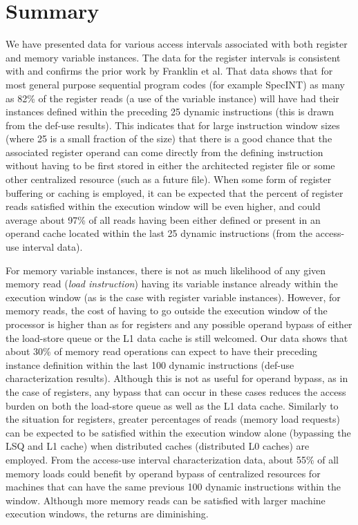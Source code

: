 \documentclass[10pt,dvips]{article}
\begin{document}
\section{Summary}
%
We have presented data for various access intervals associated
with both register and memory variable instances.
The data for the register intervals is consistent with and
confirms the prior work by Franklin et al.
That data shows that for most general purpose sequential program
codes (for example SpecINT) as many as
82\% of the register reads (a use
of the variable instance) will have had their instances defined within
the preceding 25 dynamic instructions (this is drawn from the def-use
results).  
This indicates
that for large instruction window sizes (where 25 is a small fraction of
the size) that there is a good chance that the associated register
operand can come directly from the defining instruction without
having to be first stored in either the architected register
file or some other 
centralized resource (such as a future file).
When some form of register buffering or caching is employed, it
can be expected that the percent of register reads satisfied within
the execution window will be even higher, and could average about 97\%
of all reads having been either defined or present in an operand cache 
located within
the last 25 dynamic instructions (from the access-use interval data).

For memory variable instances, there is not as much likelihood
of any given memory read (\textit{load instruction}) having its
variable instance already within the execution window (as is the
case with register variable instances).
However, for memory reads, the cost of having to go outside
the execution window of the processor is higher than as for registers
and any possible
operand bypass of either the load-store queue or the
L1 data cache is still welcomed.
Our data shows that about 30\% of memory read operations
can expect to have their preceding instance definition within
the last 100 dynamic instructions (def-use characterization results).
Although this is not as useful for operand bypass, as in the case of 
registers, any bypass that can occur in these cases reduces the
access burden on both the load-store queue as well as the L1
data cache.
Similarly to the situation for registers, greater percentages of reads
(memory load requests) can be expected to be satisfied within
the execution window alone (bypassing the LSQ and L1 cache)
when distributed caches (distributed L0 caches) are employed.
From the access-use interval characterization data, about 55\% of
all memory loads could benefit by operand bypass of centralized
resources for machines that can have the same previous 100
dynamic instructions within the window.
Although more memory reads can be satisfied with larger machine
execution windows, the returns are diminishing.
\end{document}
